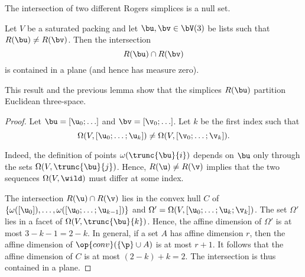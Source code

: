 
The intersection of two different Rogers simplices is a null set.

\begin{lemma}  \label{lemma:R-inter} 
Let $V$ be a saturated packing and let $\bu,\bv\in \bV(3)$ be lists such that 
$R(\bu)\ne R(\bv)$.  Then the intersection 
\[  
R(\bu)\cap R(\bv)
\] 
is contained in a plane (and hence has measure zero).
\end{lemma}

This result and the previous lemma show that the simplices $R(\bu)$
partition Euclidean three-space.

\begin{proof} Let $\bu = [\u_0;\ldots]$ and $\bv = [\v_0;\ldots]$.  
Let $k$ be the
first index such that
\[  
\Omega(V,[\u_0;\ldots;\u_{k}]) \ne \Omega(V,[\v_0;\ldots;\v_{k}]).
\] 

  Indeed, the definition of points
$\omega(\trunc{\bu}{i})$ depends on $\bu$ only through the sets
$\Omega(V,\trunc{\bu}{j})$.  Hence, $R(\u)\ne R(\v)$ implies that the
two sequences $\Omega(V,\wild )$ must differ at some index.

The intersection $R(\u)\cap R(\v)$ lies in the convex hull $C$ of
$\{\omega([\u_0]),\ldots,\omega( [\u_0;\ldots; \u_{k-1}])\}$ and
$\Omega'=\Omega(V,[\u_0;\ldots;\u_{k};\v_{k}])$.  The set $\Omega'$
lies in a facet of $\Omega(V,\trunc{\bu}{k})$.  Hence, the affine
dimension of $\Omega'$ is at most $3-k-1=2-k$.  In general, if a set
$A$ has affine dimension $r$, then the affine dimension of
$\op{conv}(\{\p\}\cup A)$ is at most $r+1$.  It follows that the
affine dimension of $C$ is at most $(2-k)+ k = 2$.  The intersection
is thus contained in a plane.
\end{proof}


